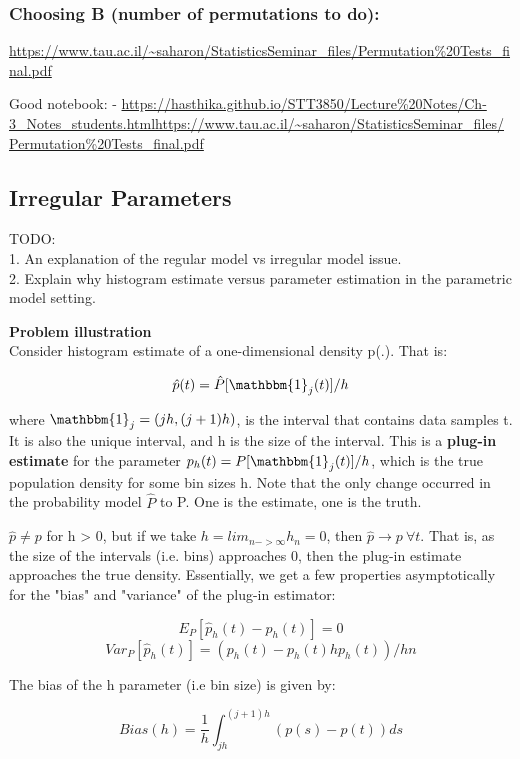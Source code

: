 		\subsubsection{Choosing B (number of permutations to do):}

		\url{https://www.tau.ac.il/~saharon/StatisticsSeminar_files/Permutation%20Tests_final.pdf}



		Good notebook: 
		- \url{https://hasthika.github.io/STT3850/Lecture%20Notes/Ch-3_Notes_students.htmlhttps://www.tau.ac.il/~saharon/StatisticsSeminar_files/Permutation%20Tests_final.pdf}

	\subsection{Irregular Parameters}

		TODO:\\
		1. An explanation of the regular model vs irregular model issue.\\
		2. Explain why histogram estimate versus parameter estimation in the parametric model setting.

		\textbf{Problem illustration}\\
		Consider histogram estimate of a one-dimensional density p(.). That is:

		$$\hat{p}(t) = \hat{P}[\mathbbm{1}_j(t)] / h$$

		where $\mathbbm{1}_j = (jh, (j+1)h)$, is the interval that contains data samples t. It is also the unique interval, and h is the size of the interval. This is a \textbf{plug-in estimate} for the parameter $p_h(t) = P[\mathbbm{1}_j(t)] / h$, which is the true population density for some bin sizes h. Note that the only change occurred in the probability model $\hat{P}$ to P. One is the estimate, one is the truth. 

		$\hat{p} \neq p$ for h > 0, but if we take $h = lim_{n->\infty} h_n = 0$, then $\hat{p} \rightarrow p \ \forall t$. That is, as the size of the intervals (i.e. bins) approaches 0, then the plug-in estimate approaches the true density. Essentially, we get a few properties asymptotically for the "bias" and "variance" of the plug-in estimator:

		$$E_P [ \hat{p}_h(t) - p_h(t)] = 0$$
		$$Var_P [\hat{p}_h(t)] = (p_h(t) - p_h(t) h p_h(t)) / hn$$

		The bias of the h parameter (i.e bin size) is given by:

		$$Bias(h) = \frac{1}{h} \int_{jh}^{(j+1)h} (p(s) - p(t)) ds$$

